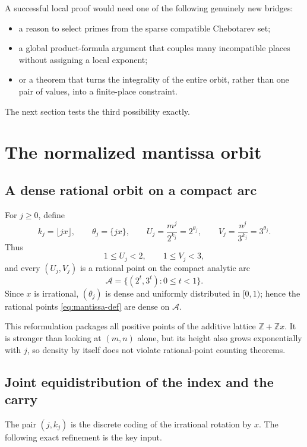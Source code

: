 \documentclass[11pt,oneside]{article}
\theoremstyle{definition}
\theoremstyle{remark}
\newcommand{\Z}{\mathbb{Z}}
\begin{document}
A successful local proof would need one of the following genuinely new
bridges:
\begin{itemize}
\item a reason to select primes from the sparse compatible Chebotarev set;
\item a global product-formula argument that couples many incompatible
      places without assigning a local exponent;
\item or a theorem that turns the integrality of the entire orbit, rather
      than one pair of values, into a finite-place constraint.
\end{itemize}
The next section tests the third possibility exactly.

\section{The normalized mantissa orbit}\label{sec:mantissa}

\subsection{A dense rational orbit on a compact arc}

For $j\ge0$, define
\begin{equation}\label{eq:mantissa-def}
 k_j=\lfloor jx\rfloor,\qquad \theta_j=\{jx\},\qquad
 U_j=\frac{m^j}{2^{k_j}}=2^{\theta_j},\qquad
 V_j=\frac{n^j}{3^{k_j}}=3^{\theta_j}.
\end{equation}
Thus
\[
 1\le U_j<2,\qquad 1\le V_j<3,
\]
and every $(U_j,V_j)$ is a rational point on the compact analytic arc
\[
 \mathcal A=\{(2^t,3^t):0\le t<1\}.
\]
Since $x$ is irrational, $(\theta_j)$ is dense and uniformly distributed in
$[0,1)$; hence the rational points \eqref{eq:mantissa-def} are dense on
$\mathcal A$.

This reformulation packages all positive points of the additive lattice
$\Z+\Z x$.  It is stronger than looking at $(m,n)$ alone, but its height
also grows exponentially with $j$, so density by itself does not violate
rational-point counting theorems.

\subsection{Joint equidistribution of the index and the carry}

The pair $(j,k_j)$ is the discrete coding of the irrational rotation by
$x$.  The following exact refinement is the key input.
\end{document}
